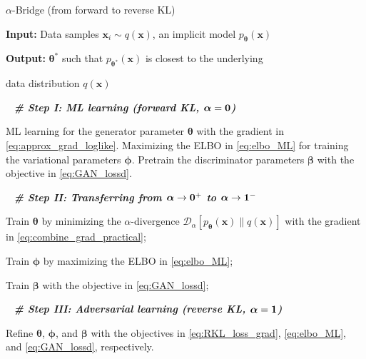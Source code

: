\documentclass[letterpaper]{article} %
\newcommand{\Dc}[0]{\ensuremath{\mathcal{D}} }
\newcommand{\xv}[0]{\ensuremath{\boldsymbol{x}} }
\newcommand{\alphav}[0]{\ensuremath{\boldsymbol{\alpha}} }
\newcommand{\betav}[0]{\ensuremath{\boldsymbol{\beta}} }
\newcommand{\thetav}[0]{\ensuremath{\boldsymbol{\theta}} }
\newcommand{\phiv}[0]{\ensuremath{\boldsymbol{\phi}} }
\begin{document}
\begin{algorithm}[tb]
  \caption{$\alpha$-Bridge (from forward to reverse KL)}
  \label{alg:Alpha-divergence}
    \begin{algorithmic}[1]

    \item[\textbf{Input:} Data samples $\xv_i \sim q(\xv)$, an implicit model $p_{\thetav}(\xv)$]

    \item[\textbf{Output:} $\thetav^{*}$ such that $p_{\thetav^{*}}(\xv)$ is closest to the underlying ]
    \item[\qquad\qquad data distribution $q(\xv)$]

      \item[\,\,\, \textit{\textbf{\# Step I: ML learning (forward KL, $\bf \alphav=0$)}}]

      \STATE ML learning for the generator parameter $\thetav$ with the gradient in \eqref{eq:approx_grad_loglike}. Maximizing the ELBO in \eqref{eq:elbo_ML} for training the variational parameters $\phiv$. Pretrain the discriminator parameters $\betav$ with the objective in \eqref{eq:GAN_lossd}.

      \item[\,\,\, \textit{\textbf{\# Step II: Transferring from $\bf \alphav \to 0^{+}$ to $\bf \alphav \to 1^{-}$}}]


		\STATE Train $\thetav$ by minimizing the $\alpha$-divergence $\Dc_{\alpha} [p_{\thetav}(\xv) \| q(\xv)]$ with the gradient in \eqref{eq:combine_grad_practical};

		\STATE Train $\phiv$ by maximizing the ELBO in \eqref{eq:elbo_ML};

      	\STATE Train $\betav$ with the objective in \eqref{eq:GAN_lossd};

      \ENDFOR

      \item[\,\,\, \textit{\textbf{\# Step III: Adversarial learning (reverse KL, $\bf \alphav=1$)}}]

      \STATE Refine $\thetav$, $\phiv$, and $\betav$ with the objectives in \eqref{eq:RKL_loss_grad}, \eqref{eq:elbo_ML}, and \eqref{eq:GAN_lossd}, respectively.

    \end{algorithmic}
\end{algorithm}
\end{document}
